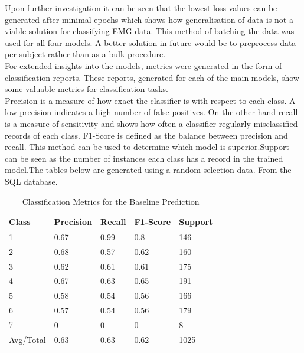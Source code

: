 \documentclass[11pt]{article}
\begin{document}
	\noindent
	Upon further investigation it can be seen that the lowest loss values can be generated after minimal epochs which shows how generalisation of data is not a viable solution for classifying EMG data. This method of batching the data was used for all four models. A better solution in future would be to preprocess data per subject rather than as a bulk procedure.\\
	
	\noindent
	For extended insights into the models, metrics were generated in the form of classification reports. These reports, generated for each of the main models, show some valuable metrics for classification tasks.\\
	
	\noindent
	Precision is a measure of how exact the classifier is with respect to each class. A low precision indicates a high number of false positives. On the other hand recall is a measure of sensitivity and shows how often a classifier regularly misclassified records of each class. F1-Score is defined as the balance between precision and recall. This method can be used to determine which model is superior.Support can be seen as the number of instances each class has a record in the trained model.The tables below are generated using a random selection data. From the SQL database.
	
	\begin{table}[H]
		\centering
		\caption{Classification Metrics for the Baseline Prediction}
		\begin{tabular}{l|llll}
			Class     & Precision & Recall & F1-Score & Support \\\hline
			1         & 0.67      & 0.99   & 0.8      & 146     \\
			2         & 0.68      & 0.57   & 0.62     & 160     \\
			3         & 0.62      & 0.61   & 0.61     & 175     \\
			4         & 0.67      & 0.63   & 0.65     & 191     \\
			5         & 0.58      & 0.54   & 0.56     & 166     \\
			6         & 0.57      & 0.54   & 0.56     & 179     \\
			7         & 0         & 0      & 0        & 8       \\
			Avg/Total & 0.63      & 0.63   & 0.62     & 1025   \\\hline\hline
		\end{tabular}
	\end{table}
	
\end{document}
